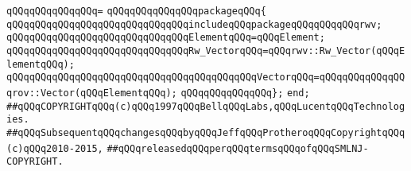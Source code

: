 \verb|qQQqqQQqqQQqqQQq=|\newline
\verb|qQQqqQQqqQQqqQQqpackageqQQq{|\newline
\verb|qQQqqQQqqQQqqQQqqQQqqQQqqQQqqQQqincludeqQQqpackageqQQqqQQqqQQqrwv;|\newline
\newline
\verb|qQQqqQQqqQQqqQQqqQQqqQQqqQQqqQQqElementqQQq=qQQqElement;|\newline
\newline
\verb|qQQqqQQqqQQqqQQqqQQqqQQqqQQqqQQqRw_VectorqQQq=qQQqrwv::Rw_Vector(qQQqElementqQQq);|\newline
\verb|qQQqqQQqqQQqqQQqqQQqqQQqqQQqqQQqqQQqqQQqqQQqVectorqQQq=qQQqqQQqqQQqqQQqrov::Vector(qQQqElementqQQq);|\newline
\verb|qQQqqQQqqQQqqQQq};|\newline
\verb|end;|\newline
\newline
\newline
\newline
\verb|##qQQqCOPYRIGHTqQQq(c)qQQq1997qQQqBellqQQqLabs,qQQqLucentqQQqTechnologies.|\newline
\verb|##qQQqSubsequentqQQqchangesqQQqbyqQQqJeffqQQqProtheroqQQqCopyrightqQQq(c)qQQq2010-2015,|\newline
\verb|##qQQqreleasedqQQqperqQQqtermsqQQqofqQQqSMLNJ-COPYRIGHT.|\newline


